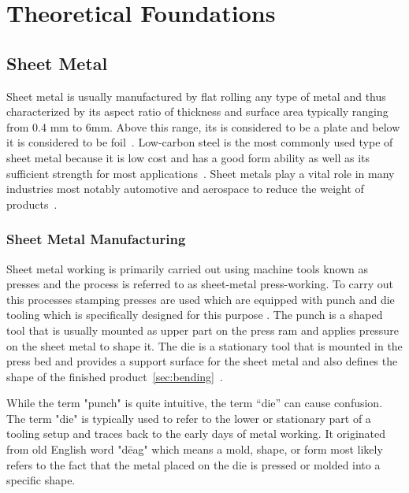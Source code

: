 \chapter{Theoretical Foundations}\label{ch:theoretical-foundations}


\section{Sheet Metal}\label{sec:sheet-metal}
Sheet metal is usually manufactured by flat rolling any type of metal and thus characterized by
its aspect ratio of thickness and surface area typically ranging from 0.4 mm to 6mm.
Above this range, its is considered to be a plate and below it is considered to be
foil~\cite[p. 405]{groover_fundamentalsmodernmanufacturing_2020}.
Low-carbon steel is the most commonly used type of sheet metal because it is low cost and has a good form ability as
well as its sufficient strength for most applications~\cite[p. 405]{groover_fundamentalsmodernmanufacturing_2020}.
Sheet metals play a vital role in many industries most notably automotive and aerospace to reduce the weight of
products~\cite[pp. 1]{zheng_reviewformingtechniques_2018}.

\subsection*{Sheet Metal Manufacturing}
Sheet metal working is primarily carried out using machine tools known as presses and the process
is referred to as sheet-metal press-working.
To carry out this processes stamping presses are used which are equipped with punch and die
tooling which is specifically designed for this purpose
\cite[p. 405]{groover_fundamentalsmodernmanufacturing_2020}.
The punch is a shaped tool that is usually mounted as upper part on the press ram and applies
pressure on the sheet metal to shape it.
The die is a stationary tool that is mounted in the press bed and provides a support surface for
the sheet metal and also defines the shape of the finished
product~\ref{sec:bending}~\cite[p. 412]{groover_fundamentalsmodernmanufacturing_2020}.

While the term "punch" is quite intuitive, the term ``die'' can cause confusion.
The term "die" is typically used to refer to the lower or stationary part of a tooling setup and traces
back to the early days of metal working.
It originated from old English word "dēag" which means a mold, shape, or form most likely refers to the fact that
the metal placed on the die is pressed or molded into a specific shape.

